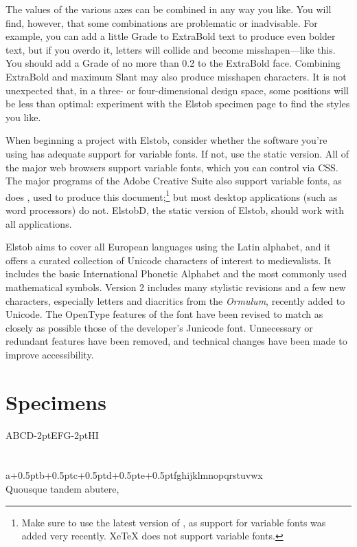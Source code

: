 \documentclass[12pt,letterpaper,openany]{book}
\begin{document}
The values of the various axes can be combined in any way you like. You will find,
however, that some combinations are problematic or inadvisable. For example,
you can add a little Grade to ExtraBold text to produce {\superbold even
bolder text}, but if you overdo it, letters will collide and become
misshapen---{\waytoobold like this}. You should add a Grade of no more than 0.2
to the ExtraBold face.
Combining ExtraBold and maximum Slant may also produce misshapen characters. It
is not unexpected that, in a three- or four-dimensional design space, some positions
will be less than optimal: experiment with the Elstob specimen page to find the
styles you like.

When beginning a project with Elstob, consider whether the software you're using
has adequate support for variable fonts. If not, use the static version.
All of the major web browsers support variable fonts, which you can control via
CSS. The major programs of the Adobe Creative Suite also support variable fonts,
as does {\ltech}, used to produce this document;\footnote{Make sure to use the
latest version of {\ltech}, as support for variable fonts was added very
recently. XeTeX does not support variable fonts.} but most desktop applications
(such as word processors) do not. ElstobD, the static version of Elstob,
should work with all applications.

Elstob aims to cover all European languages using the Latin alphabet, and it offers
a curated collection of Unicode characters of interest to medievalists. It includes
the basic International Phonetic Alphabet and the most commonly used
mathematical symbols. Version 2 includes many stylistic revisions and a few new
characters, especially letters and diacritics from the \textit{Ormulum},
recently added to Unicode. The OpenType features of the font have been revised
to match as closely as possible those of the developer's Junicode font.
Unnecessary or redundant features have been removed, and technical changes have
been made to improve accessibility.\pagebreak

\chapter{Specimens}

{\fontsize{72pt}{72pt}\selectfont ABCD\kern-2ptEFG\kern-2ptHI\\[0.3ex]
\fontsize{58}{58}\selectfont{}\\[0.1ex]
\fontsize{48}{48}\selectfont{}\\[0.4ex]
\fontsize{36}{36}\selectfont{}a\kern+0.5ptb\kern+0.5ptc\kern+0.5ptd\kern+0.5pte\kern+0.5ptfghijklmnopqrstuvwx\\[0.1ex]
Quousque tandem abutere, \linebreak
\italslanted {}\linebreak
{} }
\end{document}
